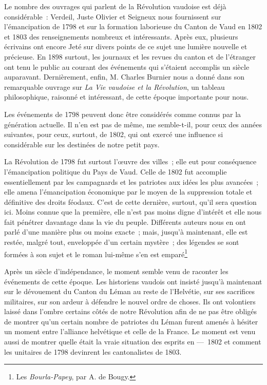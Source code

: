 \documentclass[french,twoside]{book} %
\newcommand\chaptercont{} %
\begin{document}
\chaptercont
\noindent Le nombre des ouvrages qui parlent de la Révolution vaudoise est déjà considérable : Verdeil, Juste Olivier et Seigneux nous fournissent sur l’émancipation de 1798 et sur la formation laborieuse du Canton de Vaud en 1802 et 1803 des renseignements nombreux et intéressants. Après eux, plusieurs écrivains ont encore Jeté sur divers points de ce sujet une lumière nouvelle et précieuse. En 1898 surtout, les journaux et les revues du canton et de l’étranger ont tenu le public au courant des événements qui s’étaient accomplis un siècle auparavant. Dernièrement, enfin, M. Charles Burnier nous a donné dans son remarquable ouvrage sur \emph{La Vie vaudoise et la Révolution}, un tableau philosophique, raisonné et intéressant, de cette époque importante pour nous.\par
Les événements de 1798 peuvent donc être considérés comme connus par la génération actuelle. Il n’en est pas de même, me semble-t-il, pour ceux des années suivantes, pour ceux, surtout, de 1802, qui ont exercé une influence si considérable sur les destinées de notre petit pays.\par
La Révolution de 1798 fut surtout l’œuvre des villes ; elle eut pour conséquence l’émancipation politique du Pays de Vaud. Celle de 1802 fut accomplie essentiellement par les campagnards et les patriotes aux idées les plus avancées ; elle amena l’émancipation économique par le moyen de la suppression totale et définitive des droits féodaux. C’est de cette dernière, surtout, qu’il sera question ici. Moins connue que la première, elle n’est pas moins digne d’intérêt et elle nous fait pénétrer davantage dans la vie du peuple. Différents auteurs nous en ont parlé d’une manière plus ou moins exacte ; mais, jusqu’à maintenant, elle est restée, malgré tout, enveloppée d’un certain mystère ; des légendes se sont formées à son sujet et le roman lui-même s’en est emparé\footnote{Les \emph{Bourla-Papey}, par A. de Bougy.} \par
Après un siècle d’indépendance, le moment semble venu de raconter les événements de cette époque. Les historiens vaudois ont insisté jusqu’à maintenant sur le dévouement du Canton du Léman au reste de l’Helvétie, sur ses sacrifices militaires, sur son ardeur à défendre le nouvel ordre de choses. Ils ont volontiers laissé dans l’ombre certains côtés de notre Révolution afin de ne pas être obligés de montrer qu’un certain nombre de patriotes du Léman furent amenés à hésiter un moment entre l’alliance helvétique et celle de la France. Le moment est venu aussi de montrer quelle était la vraie situation des esprits en — 1802 et comment les unitaires de 1798 devinrent les cantonalistes de 1803.\par
\end{document}
